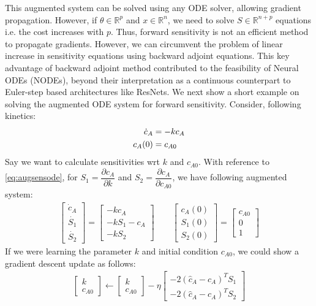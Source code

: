 \documentclass[fontsize=11pt]{article}
\newcommand{\R}{\mathbb{R}}
\theoremstyle{definition}
\begin{document}
This augmented system can be solved using any ODE solver, allowing gradient 
propagation. However, if $\theta \in \R^{p}$ and $x \in \R^{n}$, we need to 
solve $S \in \R^{n+p}$ equations i.e. the cost increases with $p$. Thus, forward
sensitivity is not an efficient method to propagate gradients. However, we can circumvent
the problem of linear increase in sensitivity equations using backward adjoint equations. This key advantage 
of backward adjoint method contributed to the feasibility of Neural ODEs (NODEs), beyond their interpretation 
as a continuous counterpart to Euler-step based architectures like ResNets. We next show 
a short example on solving the augmented ODE system for forward sensitivity. Consider, 
following kinetics:
\begin{align}
    \dot{c}_A &= -kc_A \notag \\
    c_A(0) &= c_{A0}
\end{align}
Say we want to calculate sensitivities wrt $k$ and $c_{A0}$. With reference to \cref{eq:augsensode},
for $S_1 = \dfrac{\partial c_A}{\partial k}$ and $S_2 = \dfrac{\partial c_A}{\partial c_{A0}}$,
we have following augmented system:
\begin{align}
    \begin{bmatrix} 
        \dot{c}_A \\
        \dot{S_1} \\ 
        \dot{S_2} 
    \end{bmatrix} = 
    \begin{bmatrix}
        -kc_A \\
        -kS_1 - c_A \\
        -kS_2 \end{bmatrix}
    \qquad
    \begin{bmatrix} 
        c_A(0) \\ 
        S_1(0) \\ 
        S_2(0) 
    \end{bmatrix} =
    \begin{bmatrix} 
        c_{A0} \\ 
        0 \\ 
        1
    \end{bmatrix}
\end{align}
If we were learning the parameter $k$ and initial condition $c_{A0}$, we could
show a gradient descent update as follows:
\begin{align}
    \begin{bmatrix} k \\ c_{A0} \end{bmatrix} \leftarrow
    \begin{bmatrix} k \\ c_{A0} \end{bmatrix}
    - \eta 
    \begin{bmatrix} 
        -2 (\hat{c}_A  - c_A)^T S_1 \\ 
        -2 (\hat{c}_A  - c_A)^T S_2
    \end{bmatrix}
\end{align}
\end{document}
